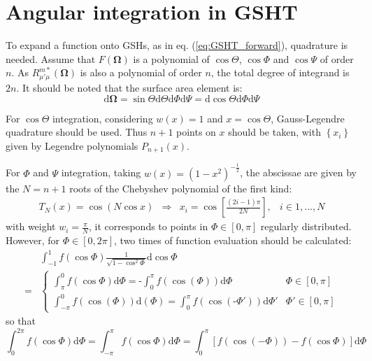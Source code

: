 \section{Angular integration in GSHT}

To expand a function onto GSHs, as in eq. (\ref{eq:GSHT_forward}),
quadrature is needed. Assume that $F(\mathbf{\Omega})$ is a polynomial
of $\cos\Theta$, $\cos\Phi$ and $\cos\Psi$ of order $n$. As $R_{\mu'\mu}^{m*}(\mathbf{\Omega})$
is also a polynomial of order $n$, the total degree of integrand
is $2n$. It should be noted that the surface area element is:
\begin{equation}
\mathrm{d}\mathbf{\Omega}=\sin\Theta\mathrm{d}\Theta\mathrm{d}\Phi\mathrm{d}\Psi=\mathrm{d}\cos\Theta\mathrm{d}\Phi\mathrm{d}\Psi
\end{equation}

For $\cos\Theta$ integration, considering $w(x)=1$ and $x=\cos\Theta$,
Gauss-Legendre quadrature should be used. Thus $n+1$ points on $x$
should be taken, with $\left\{ x_{i}\right\} $ given by Legendre
polynomials $P_{n+1}(x).$

For $\Phi$ and $\Psi$ integration, taking $w(x)=\left(1-x^{2}\right)^{-\frac{1}{2}}$,
the abscissae are given by the $N=n+1$ roots of the Chebyshev polynomial
of the first kind:
\begin{equation}
\begin{array}{cccc}
T_{N}(x)=\cos(N\cos x) & \Rightarrow & x_{i}=\cos\left[\frac{(2i-1)\pi}{2N}\right], & i\in1,\ldots,N\end{array}
\end{equation}
with weight $w_{i}=\frac{\pi}{N}$, it corresponds to points in $\Phi\in\left[0,\pi\right]$
regularly distributed. However, for $\Phi\in\left[0,2\pi\right]$,
two times of function evaluation should be calculated:
\begin{align}
 & \int_{-1}^{1}f(\cos\Phi)\frac{1}{\sqrt{1-\cos^{2}\Phi}}\mathrm{d}\cos\Phi\nonumber \\
= & \begin{cases}
\int_{\pi}^{0}f(\cos\Phi)\mathrm{d}\Phi=\text{-}\int_{0}^{\pi}f(\cos(\Phi))\mathrm{d}\Phi & \Phi\in[0,\pi]\\
\int_{-\pi}^{0}f(\cos(\Phi))\mathrm{d}(\Phi)=\int_{0}^{\pi}f(\cos(\text{-}\Phi'))\mathrm{d}\Phi' & \Phi'\in[0,\pi]
\end{cases}
\end{align}
so that
\begin{equation}
\int_{0}^{2\pi}f(\cos\Phi)\mathrm{d}\Phi=\int_{-\pi}^{\pi}f(\cos\Phi)\mathrm{d}\Phi=\int_{0}^{\pi}\left[f(\cos(-\Phi))-f(\cos\Phi)\right]\mathrm{d}\Phi
\end{equation}

